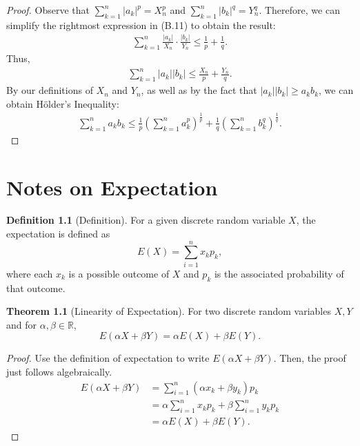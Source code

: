 \documentclass{scrippsthesisclass}
\theoremstyle{definition}
\newtheorem{defn}{Definition}[section]
\newtheorem{theorem}{Theorem}[section]
\begin{document}
\begin{proof}
    Observe that $\sum_{k=1}^n |a_k|^p = X_n^p$ and $\sum_{k=1}^n |b_k|^q = Y_n^q$. 
    Therefore, we can simplify the rightmost expression in (B.11) to obtain the result:
    \begin{align}
        \sum_{k=1}^n \frac{|a_k|}{X_n} \cdot \frac{|b_k|}{Y_n} \leq \frac{1}{p} + \frac{1}{q}.
    \end{align}
    Thus,
    \begin{align}
        \sum_{k=1}^n |a_k||b_k| \leq \frac{X_n}{p} + \frac{Y_n}{q}.
    \end{align}
    By our definitions of $X_n$ and $Y_n$, as well as by the fact that $|a_k||b_k| \geq a_kb_k$, we can obtain H\"{o}lder's Inequality:
    \begin{align}
        \sum_{k=1}^n a_kb_k \leq \frac{1}{p} \left(\sum \limits_{k=1}^n a_k^p\right)^{\frac{1}{p}} + \frac{1}{q} \left(\sum \limits_{k=1}^n b_k^q\right)^{\frac{1}{q}}.
    \end{align}
    
    
\end{proof}

\chapter{Notes on Expectation}
\begin{defn}[Definition]
    For a given discrete random variable $X$, the expectation is defined as 
    \[
    E(X) = \sum_{i=1}^n x_kp_k,
    \]
    where each $x_k$ is a possible outcome of $X$ and $p_k$ is the associated probability of that outcome. 
\end{defn}

\begin{theorem}[Linearity of Expectation]
    For two discrete random variables $X, Y$ and for $\alpha, \beta \in \mathbb{R}$, 
    \[
    E(\alpha X + \beta Y) = \alpha E(X) + \beta E(Y).
    \]
\end{theorem}
\begin{proof}
    Use the definition of expectation to write $E(\alpha X + \beta Y)$.
    Then, the proof just follows algebraically.
    \begin{align}
        E(\alpha X + \beta Y) &= \sum_{i=1}^n (\alpha x_k + \beta y_k)p_k\\
        &= \alpha \sum_{i=1}^n x_k p_k + \beta \sum_{i=1}^n y_k p_k\\
        &= \alpha E(X) + \beta E(Y).
    \end{align}
\end{proof}
\end{document}
